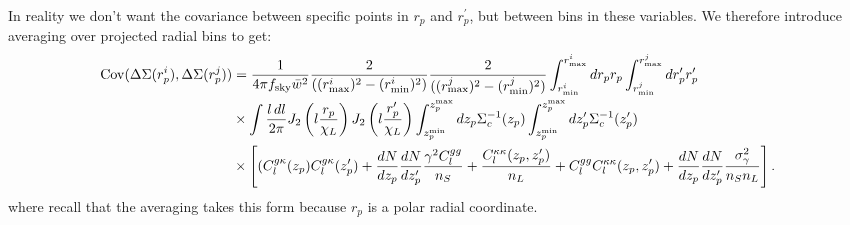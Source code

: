 \documentclass[onecolumn,amsmath,aps,fleqn, superscriptaddress]{revtex4}
\begin{document}
In reality we don't want the covariance between specific points in $r_p$ and $r_p^\prime$, but between bins in these variables. We therefore introduce averaging over projected radial bins to get:
\begin{align}
{\rm Cov}(\Delta \Sigma(r_p^i), \Delta \Sigma(r_p^j)) &= \frac{1}{4\pi f_{\rm sky}\bar{w}^2}\frac{2}{((r^i_{\rm max})^2 - (r^i_{\rm min})^2)}\frac{2}{((r^j_{\rm max})^2 - (r^j_{\rm min})^2)} \int_{r^i_{\rm min}}^{r^i_{\rm max}} dr_p r_p \int_{r^j_{\rm min}}^{r^j_{\rm max}} dr_p^\prime r_p^\prime \nonumber \\ &\times\int \frac{l \, dl}{2\pi} J_2\left(l \frac{r_p}{\chi_L}\right) J_2 \left(l \frac{r_p^\prime}{\chi_L}\right) \int_{z_p^{\rm min}}^{z_p^{\rm max}} d z_p \Sigma_c^{-1}(z_p) \int_{z_p^{\rm min}}^{z_p^{\rm max}} dz_p^\prime \Sigma_c^{-1}(z_p^\prime)\nonumber \\ &\times \left[ (C_l^{g \kappa}(z_p)C_l^{g \kappa}(z_p^\prime)  + \frac{dN}{dz_p}\frac{dN}{dz_p^\prime}\frac{ \gamma^2 C_l^{gg}}{n_S} + \frac{C_l^{\kappa \kappa}(z_p, z_p^\prime)}{n_L} + C_l^{gg} C_l^{\kappa \kappa}(z_p, z_p^\prime) + \frac{dN}{dz_p}\frac{dN}{dz_p^\prime}\frac{\sigma_{\gamma}^2}{n_S n_L}\right].
\label{covDSDS_rpavg}
\end{align}
where recall that the averaging takes this form because $r_p$ is a polar radial coordinate. 
\end{document}
